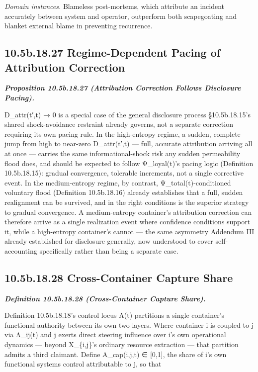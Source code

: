 \documentclass[
]{article}
\begin{document}
\emph{Domain instances.} Blameless post-mortems, which attribute an
incident accurately between system and operator, outperform both
scapegoating and blanket external blame in preventing recurrence.

\hypertarget{b.18.27-regime-dependent-pacing-of-attribution-correction}{%
\subsection{10.5b.18.27 Regime-Dependent Pacing of Attribution
Correction}\label{b.18.27-regime-dependent-pacing-of-attribution-correction}}

\emph{\textbf{Proposition 10.5b.18.27 (Attribution Correction Follows
Disclosure Pacing).}}

D\_attr(t′,t) → 0 is a special case of the general disclosure process
§10.5b.18.15's shared shock-avoidance restraint already governs, not a
separate correction requiring its own pacing rule. In the high-entropy
regime, a sudden, complete jump from high to near-zero D\_attr(t′,t) ---
full, accurate attribution arriving all at once --- carries the same
informational-shock risk any sudden permeability flood does, and should
be expected to follow Ψ\_loyal(t)'s pacing logic (Definition
10.5b.18.15): gradual convergence, tolerable increments, not a single
corrective event. In the medium-entropy regime, by contrast,
Ψ\_total(t)-conditioned voluntary flood (Definition 10.5b.18.16) already
establishes that a full, sudden realignment can be survived, and in the
right conditions is the superior strategy to gradual convergence. A
medium-entropy container's attribution correction can therefore arrive
as a single realization event where confidence conditions support it,
while a high-entropy container's cannot --- the same asymmetry Addendum
III already established for disclosure generally, now understood to
cover self-accounting specifically rather than being a separate case.

\hypertarget{b.18.28-cross-container-capture-share}{%
\subsection{10.5b.18.28 Cross-Container Capture
Share}\label{b.18.28-cross-container-capture-share}}

\emph{\textbf{Definition 10.5b.18.28 (Cross-Container Capture Share).}}

Definition 10.5b.18.18's control locus A(t) partitions a single
container's functional authority between its own two layers. Where
container i is coupled to j via Λ\_ij(t) and j exerts direct steering
influence over i's own operational dynamics --- beyond X\_\{i,j\}'s
ordinary resource extraction --- that partition admits a third claimant.
Define A\_cap(i,j,t) ∈ {[}0,1{]}, the share of i's own functional
systems control attributable to j, so that
\end{document}
